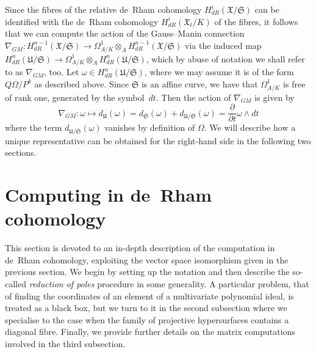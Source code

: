 Since the fibres of the relative de~Rham cohomology 
$H_{dR}^i(\mathfrak{X}/\mathfrak{S})$ can be identified with the de~Rham 
cohomology $H_{dR}^i(\mathfrak{X}_t/K)$ of the fibres, it 
follows that we can compute the action of the Gauss--Manin connection 
$\nabla_{GM} \colon H_{dR}^{n-1}(\mathfrak{X}/\mathfrak{S}) \to 
\Omega_{A/K}^1 \otimes_{A} H_{dR}^{n-1}(\mathfrak{X}/\mathfrak{S})$
via the induced map 
$H_{dR}^n(\mathfrak{U}/\mathfrak{S}) \to 
\Omega_{A/K}^1 \otimes_{A} H_{dR}^n(\mathfrak{U}/\mathfrak{S})$, 
which by abuse of notation we shall refer to as $\nabla_{GM}$, too.  
Let $\omega \in H_{dR}^{n}(\mathfrak{U}/\mathfrak{S})$, where we may 
assume it is of the form $Q \Omega / P^k$ as described above.  Since 
$\mathfrak{S}$ is an affine curve, we have that $\Omega_{A/K}^1$ is 
free of rank one, generated by the symbol~$dt$.  Then the action of 
$\nabla_{GM}$ is given by 
\begin{equation}
\nabla_{GM} \colon \omega \mapsto d_{\mathfrak{U}}(\omega) = 
    d_{\mathfrak{S}}(\omega) + d_{\mathfrak{U}/\mathfrak{S}}(\omega) = 
    \frac{\partial}{\partial t} \omega \wedge dt
\end{equation}
where the term $d_{\mathfrak{U}/\mathfrak{S}}(\omega)$ vanishes by 
definition of $\Omega$.  We will describe how a unique representative 
can be obtained for the right-hand side in the following two sections.


\section{Computing in de~{R}ham cohomology}

This section is devoted to an in-depth description of the computation in 
de~Rham cohomology, exploiting the vector space isomorphism given in 
the previous section.  We begin by setting up the notation and then describe 
the so-called \emph{reduction of poles} procedure in some generality.  
A particular problem, that of finding the coordinates of an element of a 
multivariate polynomial ideal, is treated as a black box, but we turn to it 
in the second subsection where we specialise to the case when the family of 
projective hypersurfaces contains a diagonal fibre.  Finally, we provide 
further details on the matrix computations involved in the third subsection.


